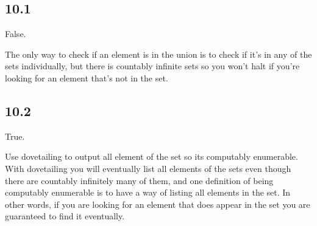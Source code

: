 \documentclass[a4paper, 11pt]{article}
\begin{document}
\subsection*{10.1}
False.

The only way to check if an element is in the union is to check if it's in any of the sets individually,
but there is countably infinite sets so you won't halt if you're looking for an element that's not in the set.

\subsection*{10.2}
True.

Use dovetailing to output all element of the set so its computably enumerable. With dovetailing you will eventually list all elements of the sets even though there are countably infinitely many of them, and one definition of being computably enumerable is to have a way of listing all elements in the set. In other words, if you are looking for an element that does appear in the set you are guaranteed to find it eventually.
\end{document}
